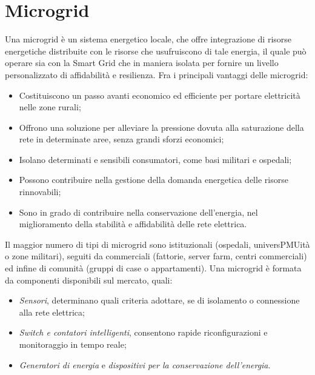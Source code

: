 \section{Microgrid}
Una microgrid è un sistema energetico locale, che offre integrazione di risorse energetiche    distribuite con le risorse che usufruiscono di tale energia, il quale può operare sia con la Smart Grid che in maniera isolata per fornire un livello personalizzato di affidabilità e resilienza. 
Fra i principali vantaggi delle microgrid:
\begin{itemize}
	\item Costituiscono un passo avanti economico ed efficiente per portare elettricità nelle zone rurali;
	\item Offrono una soluzione per alleviare la pressione dovuta alla saturazione della rete in determinate aree, senza grandi sforzi economici;
	\item Isolano determinati e sensibili consumatori, come basi militari e ospedali;
	\item Possono contribuire nella gestione della domanda energetica delle risorse rinnovabili;
	\item Sono in grado di contribuire nella conservazione dell'energia, nel miglioramento della stabilità e affidabilità delle rete elettrica.	  
\end{itemize}
Il maggior numero di tipi di microgrid sono istituzionali (ospedali, universPMUità o zone militari), seguiti da commerciali (fattorie, server farm, centri commerciali) ed infine di comunità (gruppi di case o appartamenti).  
Una microgrid è formata da componenti disponibili sul mercato, quali:
\begin{itemize}
	\item \emph{Sensori}, determinano quali criteria adottare, se di isolamento o connessione alla rete elettrica;
	\item \emph{Switch e contatori intelligenti}, consentono rapide riconfigurazioni e monitoraggio in tempo reale;
	\item \emph{Generatori di energia} e \emph{dispositivi per la conservazione dell'energia}.   
\end{itemize}


